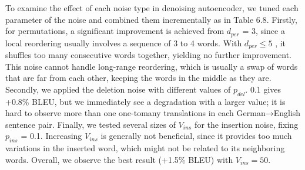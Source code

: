 	\begin{table}[H]

	\centering

	\label{tab:denoising}
		\caption{ Translation results with different values of denoising
			parameters.}
\end{table}
To examine the effect of each noise type in denoising
autoencoder, we tuned each parameter of the noise and combined them incrementally as in Table 6.8.  Firstly, for permutations, a significant improvement is achieved from $d_{per}$ = 3, since a local
reordering usually involves a sequence of 3 to 4
words. With $d_{per} \le 5$ , it shuffles too many consecutive
words together, yielding no further improvement.
This noise cannot handle long-range reordering, which is usually a swap of words that are far from each other, keeping the words in the
middle as they are. \\
Secondly, we applied the deletion noise with
different values of $p_{del}$. 0.1 gives +0.8\% BLEU, but we immediately see a degradation with a larger value; it is hard to observe more than one one-tomany
translations in each German→English sentence pair.
Finally, we tested several sizes of $V_{ins}$ for the
insertion noise, fixing $p_{ins}$ = 0.1. Increasing $V_{ins}$
is generally not beneficial, since it provides too
much variations in the inserted word, which might
not be related to its neighboring words. Overall,
we observe the best result (+1.5\% BLEU) with
$V_{ins} = 50$.



